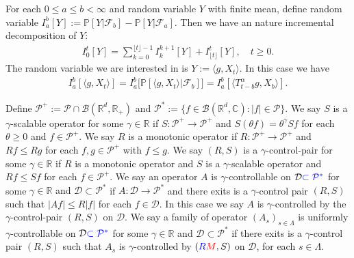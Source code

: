 \documentclass[12pt,oneside,english]{amsart}
\theoremstyle{plain}
\theoremstyle{definition}
\numberwithin{equation}{section}
\newcommand{\added}[1]{{\color{blue}#1}}\newcommand{\deleted}[1]{{\color{red}#1}}
\begin{document}
\added{
	For each $0 \leq a \leq b <\infty$ and  random variable $Y$ with finite mean, define random variable
$
   	I_a^b[Y]
    := \mathbb P[Y|\mathscr F_b] - \mathbb P[Y|\mathscr F_a].
$
	Then we have an nature incremental decomposition of $Y$:
\begin{align}
    I_0^t[Y]
    = \sum_{k = 0}^{\lfloor t \rfloor - 1} I_k^{k+1}[Y] + I_{\lfloor t \rfloor}^t[Y],
    \quad t\geq 0.
\end{align}
	The random variable we are interested in is $Y:= \langle g,X_t\rangle$.
	In this case we have
\begin{align}
    I_a^b[\langle g,X_t\rangle]
    = I_a^b\big[\mathbb P[\langle g,X_t\rangle|\mathscr F_b]\big]
    = I_a^b[ \langle T_{t-b}^\alpha g, X_b \rangle ].
\end{align}
}

    Define $\mathcal P^+:= \mathcal P \cap \mathcal B(\mathbb R^d, \mathbb R_+)$ and $\mathcal P^*:= \{f\in \mathscr B(\mathbb R^d, \mathbb C): |f|\in \mathcal P\}$.
    We say $S$ is a $\gamma$-scalable operator for some $\gamma\in \mathbb R$ if $S: \mathcal P^+ \to \mathcal P^+$ and $S(\theta f) = \theta^\gamma Sf$ for each $\theta \geq 0$ and $f \in \mathcal P^+$.
    We say $R$ is a monotonic operator if $R:\mathcal P^+ \to \mathcal P^+$ and $Rf \leq Rg$ for each $f, g \in \mathcal P^+$ with $f\leq g$.
    We say $(R,S)$ is a $\gamma$-control-pair for some $\gamma \in \mathbb R$ if $R$ is a monotonic operator and $S$ is a $\gamma$-scalable operator and $Rf\leq Sf$ for each $f\in \mathcal P^+$.
    We say an operator $A$ is $\gamma$-controllable on $\mathcal D \added{\subset \mathcal P^*}$ for some $\gamma \in \mathbb R$ \deleted{and $\mathcal D \subset \mathcal P^*$} if $A: \mathcal D \to \mathcal P^*$ and there \deleted{exits} \added{is} a $\gamma$-control pair $(R,S)$ such that $|Af|\leq R|f|$ for each $f\in \mathcal D$.
    In this case we say $A$ is $\gamma$-controlled by the $\gamma$-control-pair $(R,S)$ on $\mathcal D$.
    We say a family of operator $(A_s)_{s\in \Lambda}$ is uniformly $\gamma$-controllable on $\mathcal D\added{\subset \mathcal P^*}$ for some $\gamma \in \mathbb R$ \deleted{and $\mathcal D \subset \mathcal P^*$} if there \deleted{exits} \added{is} a $\gamma$-control pair $(R,S)$ such that $A_s$ is $\gamma$-controlled by $(\added{R}\deleted{M}, S)$ on $\mathcal D$, for each $s\in \Lambda$.
\end{document}

